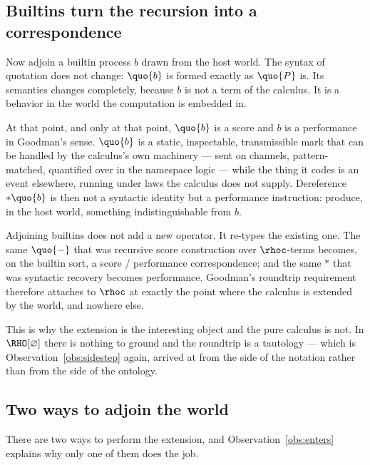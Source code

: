 \subsection{Builtins turn the recursion into a correspondence}
\label{sec:turn-of-operators}

Now adjoin a builtin process $b$ drawn from the host world.
The syntax of quotation does not change: $\quo{b}$ is formed
exactly as $\quo{P}$ is.
Its semantics changes completely, because $b$ is not a term of the
calculus.
It is a behavior in the world the computation is embedded in.

At that point, and only at that point, $\quo{b}$ is a score and $b$
is a performance in Goodman's sense.
$\quo{b}$ is a static, inspectable, transmissible mark that can be
handled by the calculus's own machinery --- sent on channels,
pattern-matched, quantified over in the namespace logic --- while
the thing it codes is an event elsewhere, running under laws the
calculus does not supply.
Dereference $*\quo{b}$ is then not a syntactic identity but a
performance instruction: produce, in the host world, something
indistinguishable from $b$.

\begin{observation}
\label{obs:enters}
Adjoining builtins does not add a new operator.
It re-types the existing one.
The same $\quo{-}$ that was recursive score construction over
$\rhoc$-terms becomes, on the builtin sort, a score / performance
correspondence; and the same $*$ that was syntactic recovery
becomes performance.
Goodman's roundtrip requirement therefore attaches to $\rhoc$ at
exactly the point where the calculus is extended by the world, and
nowhere else.
\end{observation}

\noindent
This is why the extension is the interesting object and the pure
calculus is not.
In $\RHO[\varnothing]$ there is nothing to ground and the roundtrip
is a tautology --- which is Observation~\ref{obs:sidestep} again,
arrived at from the side of the notation rather than from the side
of the ontology.

\subsection{Two ways to adjoin the world}
\label{sec:two-ways}

There are two ways to perform the extension, and
Observation~\ref{obs:enters} explains why only one of them does the
job.

